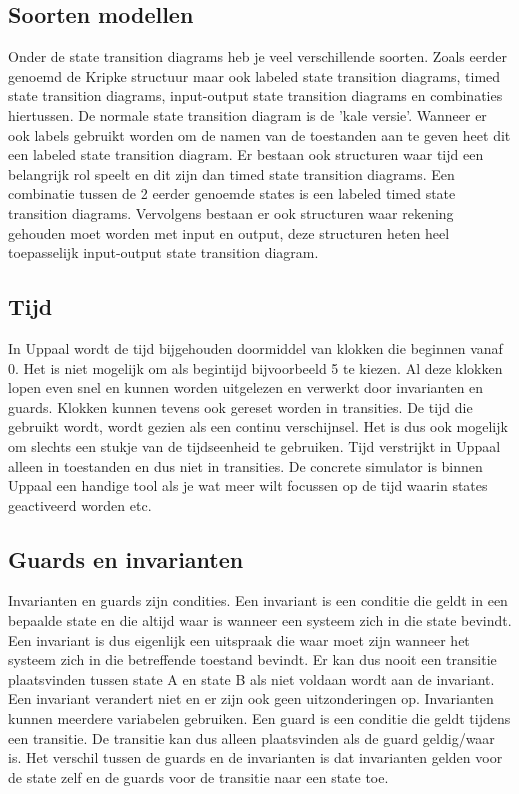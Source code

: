\documentclass{article}
\begin{document}
\subsection{Soorten modellen}
Onder de state transition diagrams heb je veel verschillende soorten. Zoals eerder genoemd de Kripke structuur maar ook labeled state transition diagrams, timed state transition diagrams, input-output state transition diagrams en combinaties hiertussen.
De normale state transition diagram is de 'kale versie'. Wanneer er ook labels gebruikt worden om de namen van de toestanden aan te geven heet dit een labeled state transition diagram. Er bestaan ook structuren waar tijd een belangrijk rol speelt en dit zijn dan timed state transition diagrams. Een combinatie tussen de 2 eerder genoemde states is een labeled timed state transition diagrams. Vervolgens bestaan er ook structuren waar rekening gehouden moet worden met input en output, deze structuren heten heel toepasselijk input-output state transition diagram.

\subsection{Tijd}
In Uppaal wordt de tijd bijgehouden doormiddel van klokken die beginnen vanaf 0. Het is niet mogelijk om als begintijd bijvoorbeeld 5 te kiezen. Al deze klokken lopen even snel en kunnen worden uitgelezen en verwerkt door invarianten en guards. Klokken kunnen tevens ook gereset worden in transities. De tijd die gebruikt wordt, wordt gezien als een continu verschijnsel. Het is dus ook mogelijk om slechts een stukje van de tijdseenheid te gebruiken. Tijd verstrijkt in Uppaal alleen in toestanden en dus niet in transities.
De concrete simulator is binnen Uppaal een handige tool als je wat meer wilt focussen op de tijd waarin states geactiveerd worden etc.

\subsection{Guards en invarianten}
Invarianten en guards zijn condities. Een invariant is een conditie die geldt in een bepaalde state en die altijd waar is wanneer een systeem zich in die state bevindt. Een invariant is dus eigenlijk een uitspraak die waar moet zijn wanneer het systeem zich in die betreffende toestand bevindt. Er kan dus nooit een transitie plaatsvinden tussen state A en state B als niet voldaan wordt aan de invariant. Een invariant verandert niet en er zijn ook geen uitzonderingen op. Invarianten kunnen meerdere variabelen gebruiken.
Een guard is een conditie die geldt tijdens een transitie. De transitie kan dus alleen plaatsvinden als de guard geldig/waar is. 
Het verschil tussen de guards en de invarianten is dat invarianten gelden voor de state zelf en de guards voor de transitie naar een state toe.
\end{document}
